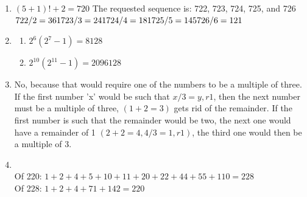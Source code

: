\documentclass[12pt]{exam}
\begin{document}
\begin{enumerate}
\item $(5+1)! + 2 = 720$ 
The requested sequence is: 722, 723, 724, 725, and 726 \\
$722 / 2 = 361 \\
723 / 3 = 241\\
724 / 4 = 181\\
725 / 5 = 145\\
726 / 6 = 121$\\

\item \begin{enumerate}
    \item $ 2^6(2^7-1) = 8128$ \\
    \item $ 2^10(2^11-1) = 2096128$ \\

\end{enumerate}


\item No, because that would require one of the numbers to be a multiple of three. 
If the first number 'x' would be such that $x / 3 = y, r 1$, then the next number must be a multiple of three, $( 1 + 2 = 3)$ gets rid of the remainder.
If the first number is such that the remainder would be two, the next one would have a remainder of 1 $(2 + 2 = 4, 4 / 3 = 1, r 1)$, the third one would then be a multiple of 3.

\item \\
Of 220: $ 1 + 2 + 4 + 5 + 10 + 11 + 20 + 22 + 44 + 55 + 110 = 228 $ \\
Of 228: $1 + 2 + 4 + 71 + 142 = 220 $



\end{enumerate}
\end{document}

